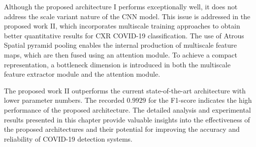 Although the proposed architecture I performs exceptionally well, it does not address the scale variant nature of the CNN model. This issue is addressed in the proposed work II, which incorporates multiscale training approaches to obtain better quantitative results for CXR COVID-19 classification. The use of Atrous Spatial pyramid pooling enables the internal production of multiscale feature maps, which are then fused using an attention module. To achieve a compact representation, a bottleneck dimension is introduced in both the multiscale feature extractor module and the attention module.

The proposed work II outperforms the current state-of-the-art architecture with lower parameter numbers. The recorded $0.9929$ for the F1-score indicates the high performance of the proposed architecture. The detailed analysis and experimental results presented in this chapter provide valuable insights into the effectiveness of the proposed architectures and their potential for improving the accuracy and reliability of COVID-19 detection systems.
